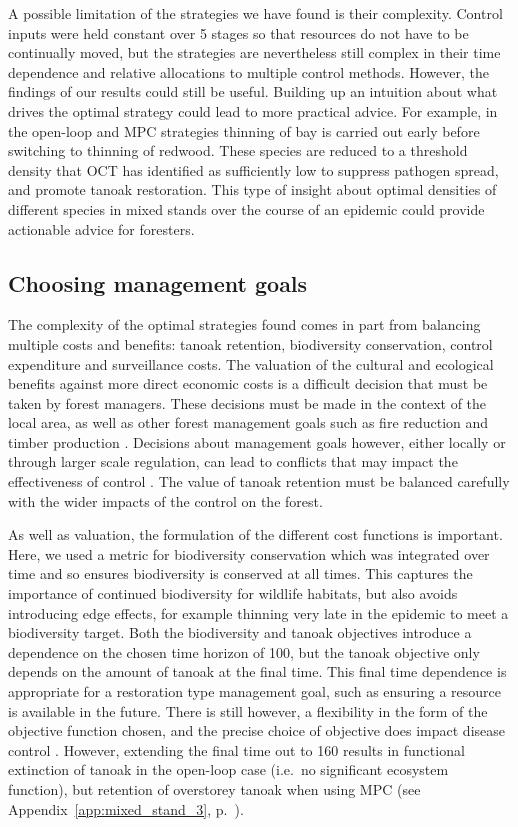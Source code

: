A possible limitation of the strategies we have found is their complexity. Control inputs were held constant over \SI{5}{\year} stages so that resources do not have to be continually moved, but the strategies are nevertheless still complex in their time dependence and relative allocations to multiple control methods. However, the findings of our results could still be useful. Building up an intuition about what drives the optimal strategy could lead to more practical advice. For example, in the open-loop and MPC strategies thinning of bay is carried out early before switching to thinning of redwood. These species are reduced to a threshold density that OCT has identified as sufficiently low to suppress pathogen spread, and promote tanoak restoration. This type of insight about optimal densities of different species in mixed stands over the course of an epidemic could provide actionable advice for foresters.

\subsection{Choosing management goals}

The complexity of the optimal strategies found comes in part from balancing multiple costs and benefits: tanoak retention, biodiversity conservation, control expenditure and surveillance costs. The valuation of the cultural and ecological benefits against more direct economic costs is a difficult decision that must be taken by forest managers. These decisions must be made in the context of the local area, as well as other forest management goals such as fire reduction and timber production \citep{cobb_resiliency_2017}. Decisions about management goals however, either locally or through larger scale regulation, can lead to conflicts that may impact the effectiveness of control \citep{alexander_lessons_2010}. The value of tanoak retention must be balanced carefully with the wider impacts of the control on the forest.

As well as valuation, the formulation of the different cost functions is important. Here, we used a metric for biodiversity conservation which was integrated over time and so ensures biodiversity is conserved at all times. This captures the importance of continued biodiversity for wildlife habitats, but also avoids introducing edge effects, for example thinning very late in the epidemic to meet a biodiversity target. Both the biodiversity and tanoak objectives introduce a dependence on the chosen time horizon of \SI{100}{\years}, but the tanoak objective only depends on the amount of tanoak at the final time. This final time dependence is appropriate for a restoration type management goal, such as ensuring a resource is available in the future. There is still however, a flexibility in the form of the objective function chosen, and the precise choice of objective does impact disease control \citep{probert_decision_2016}. However, extending the final time out to \SI{160}{\years} results in functional extinction of tanoak in the open-loop case (i.e.\ no significant ecosystem function), but retention of overstorey tanoak when using MPC (see Appendix~\ref{app:mixed_stand_3}, p.~\pageref{app:mixed_stand_3}).

